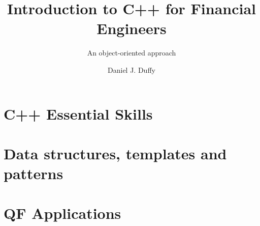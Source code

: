 \documentclass[
	a4paper,
	10pt,
	oneside
]{scrbook}
\begin{document}
\title{
	Introduction to C++ for Financial Engineers
}
\subtitle{
	An object-oriented approach
}

\author{Daniel J. Duffy}

\maketitle

\frontmatter

\tableofcontents
\lstlistoflistings
\listofalgorithms

\hypersetup{pageanchor=false}

\mainmatter



\part{C++ Essential Skills}

\begingroup
\let\clearpage\relax










\endgroup

\part{Data structures, templates and patterns}

\begingroup
\let\clearpage\relax




\endgroup

\part{QF Applications}

\begingroup
\let\clearpage\relax


\endgroup

\backmatter
\end{document}
